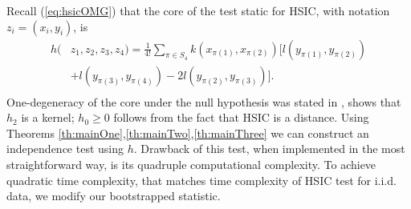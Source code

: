 Recall (\ref{eq:hsicOMG}) that the core of the test static for HSIC, with notation $z_i = (x_i,y_i)$, is  
\begin{equation*}
\begin{split}
h(&z_1,z_2,z_3,z_4) = \frac{1}{4!} \sum_{\pi \in S_4}  k(x_{\pi(1)},x_{\pi(2)}) [  l(y_{\pi(1)},y_{\pi(2)})  \\
 &+  l(y_{\pi(3)},y_{\pi(4)}) - 2  l(y_{\pi(2)},y_{\pi(3)})] . \\
\end{split}  
\end{equation*}
One-degeneracy of the core under the null hypothesis was stated in \cite[Theorem 2]{gretton_kernel_2008}, \cite[Section A.2, following eq. (11)]{gretton_kernel_2008} shows that $h_2$ is a kernel; $h_0\geq 0$ follows from the fact that HSIC is a distance. Using Theorems \ref{th:mainOne},\ref{th:mainTwo},\ref{th:mainThree} we can construct an independence test using $h$. Drawback of this test, when implemented in the most straightforward way,  is its quadruple computational complexity. To achieve quadratic time complexity, that matches time complexity of HSIC test for i.i.d. data, we modify our bootstrapped statistic.

